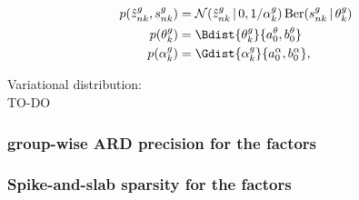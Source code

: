 \begin{align}
	p(\hat{z}_{nk}^g,s_{nk}^g) &= \mathcal{N} (\hat{z}_{nk}^g \,|\, 0, 1/\alpha_k^g)\, \text{Ber}(s_{nk}^g \,|\,\theta_k^g) \\
	p(\theta_k^g) &= \Bdist{\theta_k^g}{a_0^\theta,b_0^\theta}\\
	p(\alpha_k^g) &= \Gdist{\alpha_k^g}{a_0^\alpha, b_0^\alpha},
\end{align}

Variational distribution:\\
TO-DO

\subsubsection{group-wise ARD precision for the factors}
\subsubsection{Spike-and-slab sparsity for the factors}








